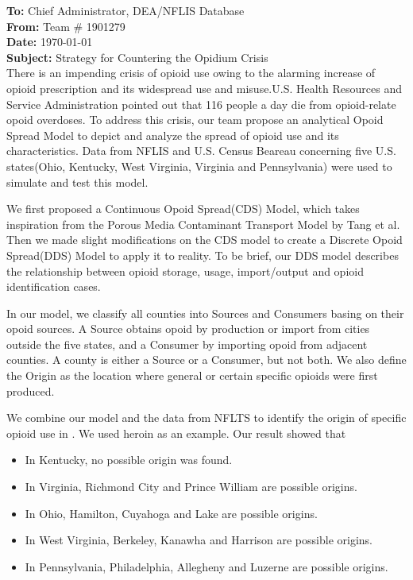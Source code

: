 \textbf{To: }Chief Administrator, DEA/NFLIS Database \\
\textbf{From: }Team \# 1901279 \\
\textbf{Date: }\today \\
\textbf{Subject: }Strategy for Countering the Opidium Crisis \\

There is an impending crisis of opioid use owing to the alarming increase of opioid prescription and its widespread use and misuse.U.S. Health Resources and Service Administration pointed out that 116 people a day die from opioid-relate opoid overdoses. To address this crisis, our team propose an analytical Opoid Spread Model to depict and analyze the spread of opioid use and its characteristics. Data from NFLIS and U.S. Census Beareau concerning five U.S. states(Ohio, Kentucky, West Virginia, Virginia and Pennsylvania) were used to simulate and test this model.

We first proposed a Continuous Opoid Spread(CDS) Model, which takes inspiration from the Porous Media Contaminant Transport Model by Tang et al. Then we made slight modifications on the CDS model to create a Discrete Opoid Spread(DDS) Model to apply it to reality. To be brief, our DDS model describes the relationship between opioid storage, usage, import/output and opioid identification cases. 

In our model, we classify all counties into Sources and Consumers basing on their opoid sources. A Source obtains opoid by production or import from cities outside the five states, and a Consumer by importing opoid from adjacent counties. A county is either a Source or a Consumer, but not both. We also define the Origin as the location where general or certain specific opioids were first produced.

We combine our model and the data from NFLTS to identify the origin of specific opioid use in . We used heroin as an example. Our result showed that 
\begin{itemize}
	\item In Kentucky, no possible origin was found.
	\item In Virginia, Richmond City and Prince William are possible origins.
	\item In Ohio, Hamilton, Cuyahoga and Lake are possible origins.
	\item In West Virginia, Berkeley, Kanawha and Harrison are possible origins.
	\item In Pennsylvania, Philadelphia, Allegheny and Luzerne are possible origins.
\end{itemize}

